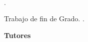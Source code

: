 

\thispagestyle{empty}

\begin{center}
    \textrm{\miNombre} \\ \bigskip                        

    \begingroup
        \textsc{\miTitulo}
    \endgroup
\end{center}        

\newpage

\thispagestyle{empty}

\hfill

\vfill

\noindent\miNombre \textit{\miTitulo}.

Trabajo de fin de Grado. \miCurso.

\begin{minipage}[t]{0.15\textwidth}
  \textbf{Tutores}
\end{minipage}
\begin{minipage}[t]{0.55\textwidth}
  \flushleft
  \miTutor
\end{minipage}
\begin{minipage}[t]{0.30\textwidth}
  \flushright
  \miGrado 
  \medskip

  \miFacultad
  \medskip

  \miUniversidad
\end{minipage}
\begin{flushleft}
\end{flushleft}

\endinput

